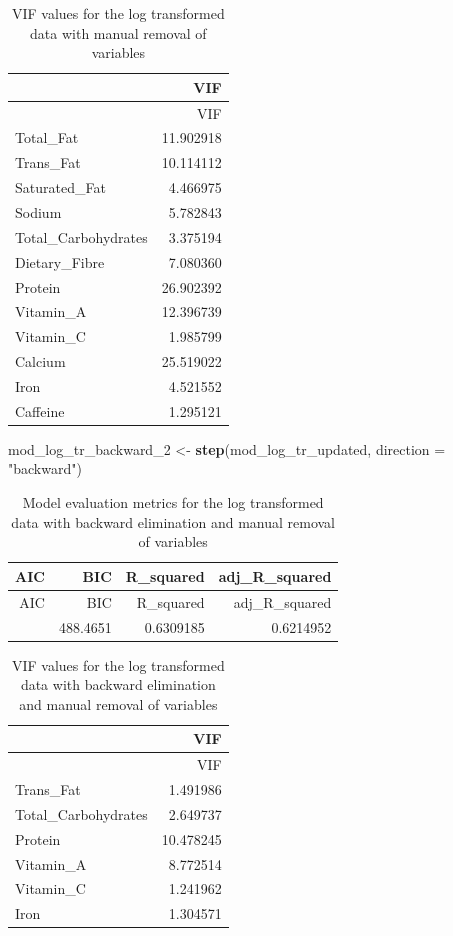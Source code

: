 \documentclass[
]{article}
\newenvironment{Shaded}{\begin{snugshade}}{\end{snugshade}}
\newcommand{\AttributeTok}[1]{\textcolor[rgb]{0.13,0.29,0.53}{#1}}
\newcommand{\FunctionTok}[1]{\textcolor[rgb]{0.13,0.29,0.53}{\textbf{#1}}}
\newcommand{\NormalTok}[1]{#1}
\newcommand{\OtherTok}[1]{\textcolor[rgb]{0.56,0.35,0.01}{#1}}
\newcommand{\StringTok}[1]{\textcolor[rgb]{0.31,0.60,0.02}{#1}}
\begin{document}
\begin{longtable}[]{@{}lr@{}}
\caption{VIF values for the log transformed data with manual removal of
variables}\tabularnewline
\toprule\noalign{}
& VIF \\
\midrule\noalign{}
\endfirsthead
\toprule\noalign{}
& VIF \\
\midrule\noalign{}
\endhead
\bottomrule\noalign{}
\endlastfoot
Total\_Fat & 11.902918 \\
Trans\_Fat & 10.114112 \\
Saturated\_Fat & 4.466975 \\
Sodium & 5.782843 \\
Total\_Carbohydrates & 3.375194 \\
Dietary\_Fibre & 7.080360 \\
Protein & 26.902392 \\
Vitamin\_A & 12.396739 \\
Vitamin\_C & 1.985799 \\
Calcium & 25.519022 \\
Iron & 4.521552 \\
Caffeine & 1.295121 \\
\end{longtable}

\begin{Shaded}
\begin{Highlighting}[]
\NormalTok{mod\_log\_tr\_backward\_2 }\OtherTok{\textless{}{-}} \FunctionTok{step}\NormalTok{(mod\_log\_tr\_updated, }\AttributeTok{direction =} \StringTok{"backward"}\NormalTok{)}
\end{Highlighting}
\end{Shaded}

\begin{longtable}[]{@{}rrrr@{}}
\caption{Model evaluation metrics for the log transformed data with
backward elimination and manual removal of variables}\tabularnewline
\toprule\noalign{}
AIC & BIC & R\_squared & adj\_R\_squared \\
\midrule\noalign{}
\endfirsthead
\toprule\noalign{}
AIC & BIC & R\_squared & adj\_R\_squared \\
\midrule\noalign{}
\endhead
\bottomrule\noalign{}
\endlastfoot
460.5536 & 488.4651 & 0.6309185 & 0.6214952 \\
\end{longtable}

\begin{longtable}[]{@{}lr@{}}
\caption{VIF values for the log transformed data with backward
elimination and manual removal of variables}\tabularnewline
\toprule\noalign{}
& VIF \\
\midrule\noalign{}
\endfirsthead
\toprule\noalign{}
& VIF \\
\midrule\noalign{}
\endhead
\bottomrule\noalign{}
\endlastfoot
Trans\_Fat & 1.491986 \\
Total\_Carbohydrates & 2.649737 \\
Protein & 10.478245 \\
Vitamin\_A & 8.772514 \\
Vitamin\_C & 1.241962 \\
Iron & 1.304571 \\
\end{longtable}
\end{document}
